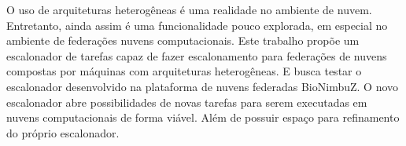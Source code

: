 
O uso de arquiteturas heterogêneas é uma realidade no ambiente de nuvem. Entretanto, ainda assim é uma funcionalidade pouco explorada, em especial no ambiente de federações nuvens computacionais. Este trabalho propõe um escalonador de tarefas capaz de fazer escalonamento para federações de nuvens compostas por máquinas com arquiteturas heterogêneas. E busca testar o escalonador desenvolvido na plataforma de nuvens federadas BioNimbuZ. O novo escalonador abre possibilidades de novas tarefas para serem executadas em nuvens computacionais de forma viável. Além de possuir espaço para refinamento do próprio escalonador.

